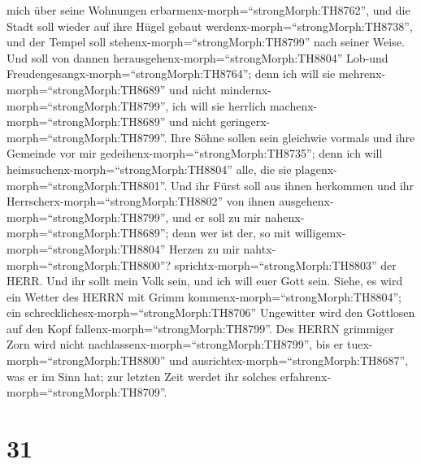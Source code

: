 mich über seine Wohnungen erbarmenx-morph=``strongMorph:TH8762'', und
die Stadt soll wieder auf ihre Hügel gebaut
werdenx-morph=``strongMorph:TH8738'', und der Tempel soll
stehenx-morph=``strongMorph:TH8799'' nach seiner Weise. 
Und soll von dannen herausgehenx-morph=``strongMorph:TH8804'' Lob-und
Freudengesangx-morph=``strongMorph:TH8764''; denn ich will sie
mehrenx-morph=``strongMorph:TH8689'' und nicht
mindernx-morph=``strongMorph:TH8799'', ich will sie herrlich
machenx-morph=``strongMorph:TH8689'' und nicht
geringerx-morph=``strongMorph:TH8799''.  Ihre Söhne sollen
sein gleichwie vormals und ihre Gemeinde vor mir
gedeihenx-morph=``strongMorph:TH8735''; denn ich will
heimsuchenx-morph=``strongMorph:TH8804'' alle, die sie
plagenx-morph=``strongMorph:TH8801''.  Und ihr Fürst soll
aus ihnen herkommen und ihr Herrscherx-morph=``strongMorph:TH8802'' von
ihnen ausgehenx-morph=``strongMorph:TH8799'', und er soll zu mir
nahenx-morph=``strongMorph:TH8689''; denn wer ist der, so mit
willigemx-morph=``strongMorph:TH8804'' Herzen zu mir
nahtx-morph=``strongMorph:TH8800''?
sprichtx-morph=``strongMorph:TH8803'' der HERR.  Und ihr
sollt mein Volk sein, und ich will euer Gott sein.  Siehe,
es wird ein Wetter des HERRN mit Grimm
kommenx-morph=``strongMorph:TH8804''; ein
schrecklichesx-morph=``strongMorph:TH8706'' Ungewitter wird den
Gottlosen auf den Kopf fallenx-morph=``strongMorph:TH8799''.
 Des HERRN grimmiger Zorn wird nicht
nachlassenx-morph=``strongMorph:TH8799'', bis er
tuex-morph=``strongMorph:TH8800'' und
ausrichtex-morph=``strongMorph:TH8687'', was er im Sinn hat; zur letzten
Zeit werdet ihr solches erfahrenx-morph=``strongMorph:TH8709''.

\hypertarget{section-30}{%
\section{31}\label{section-30}}


